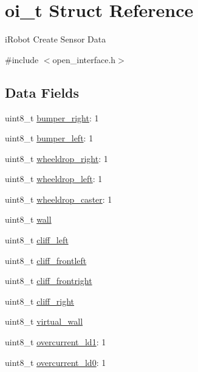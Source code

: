 \hypertarget{structoi__t}{\section{oi\-\_\-t Struct Reference}
\label{structoi__t}
}


i\-Robot Create Sensor Data  




{\ttfamily \#include $<$open\-\_\-interface.\-h$>$}

\subsection*{Data Fields}
\begin{DoxyCompactItemize}
\item 
uint8\-\_\-t \hyperlink{structoi__t_acc6431e93991c008a51aced2d45df5af}{bumper\-\_\-right}\-: 1
\item 
uint8\-\_\-t \hyperlink{structoi__t_acbfc15d44c4559229f8196d63a525a70}{bumper\-\_\-left}\-: 1
\item 
uint8\-\_\-t \hyperlink{structoi__t_aa73acdcd8ac4389650026caf557884ad}{wheeldrop\-\_\-right}\-: 1
\item 
uint8\-\_\-t \hyperlink{structoi__t_ab543a5270116bfe2f31a3b84cbed927b}{wheeldrop\-\_\-left}\-: 1
\item 
uint8\-\_\-t \hyperlink{structoi__t_a29269b6b5ac74f91cb0ca6ec515e1bf0}{wheeldrop\-\_\-caster}\-: 1
\item 
uint8\-\_\-t \hyperlink{structoi__t_af83dd458b2195ad2b2238cc08a6310ba}{wall}
\item 
uint8\-\_\-t \hyperlink{structoi__t_affb7f1b56ad42532b7f072bbf2e4f622}{cliff\-\_\-left}
\item 
uint8\-\_\-t \hyperlink{structoi__t_ae821644ba98f02e928df21fd7dad3f9f}{cliff\-\_\-frontleft}
\item 
uint8\-\_\-t \hyperlink{structoi__t_af5140038f1e232eb2de044c24fa76ae8}{cliff\-\_\-frontright}
\item 
uint8\-\_\-t \hyperlink{structoi__t_ad449ba0f3d060a85bc5a0807aff0ff26}{cliff\-\_\-right}
\item 
uint8\-\_\-t \hyperlink{structoi__t_aeedec98977709bdc91ec71296a3a2d22}{virtual\-\_\-wall}
\item 
uint8\-\_\-t \hyperlink{structoi__t_aa67fdcc549c24fb47a7164669994806d}{overcurrent\-\_\-ld1}\-: 1
\item 
uint8\-\_\-t \hyperlink{structoi__t_abd137daff3c53cb58ace285b1df1c524}{overcurrent\-\_\-ld0}\-: 1
\item 

\end{DoxyCompactItemize}
